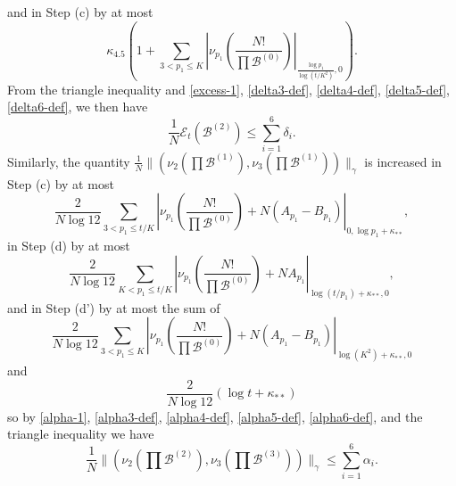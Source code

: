 \documentclass[12pt,a4paper,reqno]{amsart}
\numberwithin{equation}{section}
\theoremstyle{plain}
\theoremstyle{definition}
\newcommand\tuple{{\mathcal B}}
\newcommand\excess{{\mathcal{E}}}
\begin{document}
and in Step (c) by at most
$$ \kappa_{4.5} \left(1 + \sum_{3 < p_1 \leq K} \left|\nu_{p_1}\left( \frac{N!}{\prod \tuple^{(0)}} \right) \right|_{\frac{\log p_1}{\log(t/K^2)},0}\right).$$
From the triangle inequality and \eqref{excess-1}, \eqref{delta3-def}, \eqref{delta4-def}, \eqref{delta5-def}, \eqref{delta6-def}, we then have
\begin{equation}\label{excess-2}
   \frac{1}{N} \excess_t(\tuple^{(2)}) \leq \sum_{i=1}^6 \delta_i.
\end{equation}
Similarly, the quantity $\frac{1}{N} \| (\nu_2(\prod \tuple^{(1)}),\nu_3(\prod \tuple^{(1)}))\|_\gamma$ is increased in Step (c) by at most
$$\frac{2}{N\log 12} \sum_{3 < p_1 \leq t/K} \left|\nu_{p_1}\left( \frac{N!}{\prod \tuple^{(0)}} \right) + N(A_{p_1} - B_{p_1}) \right|_{0,\log p_1 + \kappa_{**}},$$
in Step (d) by at most
$$\frac{2}{N\log 12} \sum_{K < p_1 \leq t/K} \left|\nu_{p_1}\left( \frac{N!}{\prod \tuple^{(0)}} \right) + NA_{p_1} \right|_{\log(t/p_1) + \kappa_{**},0},$$
and in Step (d') by at most the sum of
$$\frac{2}{N\log 12} \sum_{3 < p_1 \leq K} \left|\nu_{p_1}\left( \frac{N!}{\prod \tuple^{(0)}} \right) + N(A_{p_1}-B_{p_1}) \right|_{\log(K^2) + \kappa_{**},0}$$
and
$$\frac{2}{N\log 12} \left( \log t + \kappa_{**} \right)$$
so by \eqref{alpha-1}, \eqref{alpha3-def}, \eqref{alpha4-def}, \eqref{alpha5-def}, \eqref{alpha6-def}, and the triangle inequality we have
\begin{equation}\label{alpha-2} 
\frac{1}{N} \| (\nu_2(\prod \tuple^{(2)}), \nu_3(\prod \tuple^{(3)})) \|_\gamma \leq \sum_{i=1}^6 \alpha_i.
\end{equation}
\end{document}
